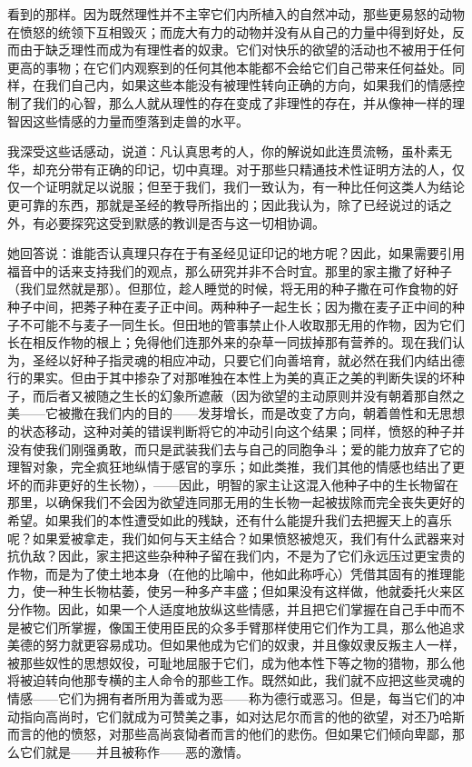 看到的那样。因为既然理性并不主宰它们内所植入的自然冲动，那些更易怒的动物在愤怒的统领下互相毁灭；而庞大有力的动物并没有从自己的力量中得到好处，反而由于缺乏理性而成为有理性者的奴隶。它们对快乐的欲望的活动也不被用于任何更高的事物；在它们内观察到的任何其他本能都不会给它们自己带来任何益处。同样，在我们自己内，如果这些本能没有被理性转向正确的方向，如果我们的情感控制了我们的心智，那么人就从理性的存在变成了非理性的存在，并从像神一样的理智因这些情感的力量而堕落到走兽的水平。\par

我深受这些话感动，说道：凡认真思考的人，你的解说如此连贯流畅，虽朴素无华，却充分带有正确的印记，切中真理。对于那些只精通技术性证明方法的人，仅仅一个证明就足以说服；但至于我们，我们一致认为，有一种比任何这类人为结论更可靠的东西，那就是圣经的教导所指出的；因此我认为，除了已经说过的话之外，有必要探究这受到默感的教训是否与这一切相协调。\par

她回答说：谁能否认真理只存在于有圣经见证印记的地方呢？因此，如果需要引用福音中的话来支持我们的观点，那么研究并非不合时宜。那里的家主撒了好种子（我们显然就是那）。但那位，趁人睡觉的时候，将无用的种子撒在可作食物的好种子中间，把莠子种在麦子正中间。两种种子一起生长；因为撒在麦子正中间的种子不可能不与麦子一同生长。但田地的管事禁止仆人收取那无用的作物，因为它们长在相反作物的根上；免得他们连那外来的杂草一同拔掉那有营养的。现在我们认为，圣经以好种子指灵魂的相应冲动，只要它们向善培育，就必然在我们内结出德行的果实。但由于其中掺杂了对那唯独在本性上为美的真正之美的判断失误的坏种子，而后者又被随之生长的幻象所遮蔽（因为欲望的主动原则并没有朝着那自然之美——它被撒在我们内的目的——发芽增长，而是改变了方向，朝着兽性和无思想的状态移动，这种对美的错误判断将它的冲动引向这个结果；同样，愤怒的种子并没有使我们刚强勇敢，而只是武装我们去与自己的同胞争斗；爱的能力放弃了它的理智对象，完全疯狂地纵情于感官的享乐；如此类推，我们其他的情感也结出了更坏的而非更好的生长物），——因此，明智的家主让这混入他种子中的生长物留在那里，以确保我们不会因为欲望连同那无用的生长物一起被拔除而完全丧失更好的希望。如果我们的本性遭受如此的残缺，还有什么能提升我们去把握天上的喜乐呢？如果爱被拿走，我们如何与天主结合？如果愤怒被熄灭，我们有什么武器来对抗仇敌？因此，家主把这些杂种种子留在我们内，不是为了它们永远压过更宝贵的作物，而是为了使土地本身（在他的比喻中，他如此称呼心）凭借其固有的推理能力，使一种生长物枯萎，使另一种多产丰盛；但如果没有这样做，他就委托火来区分作物。因此，如果一个人适度地放纵这些情感，并且把它们掌握在自己手中而不是被它们所掌握，像国王使用臣民的众多手臂那样使用它们作为工具，那么他追求美德的努力就更容易成功。但如果他成为它们的奴隶，并且像奴隶反叛主人一样，被那些奴性的思想奴役，可耻地屈服于它们，成为他本性下等之物的猎物，那么他将被迫转向他那专横的主人命令的那些工作。既然如此，我们就不应把这些灵魂的情感——它们为拥有者所用为善或为恶——称为德行或恶习。但是，每当它们的冲动指向高尚时，它们就成为可赞美之事，如对达尼尔而言的他的欲望，对丕乃哈斯而言的他的愤怒，对那些高尚哀恸者而言的他们的悲伤。但如果它们倾向卑鄙，那么它们就是——并且被称作——恶的激情。\par


